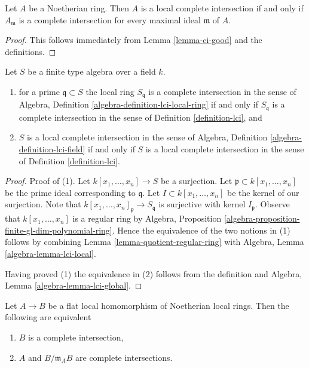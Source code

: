 \begin{lemma}
\label{lemma-check-lci-at-maximal-ideals}
Let $A$ be a Noetherian ring. Then $A$ is a local complete intersection
if and only if $A_\mathfrak m$ is a complete intersection for every
maximal ideal $\mathfrak m$ of $A$.
\end{lemma}

\begin{proof}
This follows immediately from Lemma \ref{lemma-ci-good} and the definitions.
\end{proof}

\begin{lemma}
\label{lemma-check-lci-agrees}
Let $S$ be a finite type algebra over a field $k$.
\begin{enumerate}
\item for a prime $\mathfrak q \subset S$ the local ring $S_\mathfrak q$
is a complete intersection in the sense of
Algebra, Definition \ref{algebra-definition-lci-local-ring}
if and only if $S_\mathfrak q$ is a complete
intersection in the sense of Definition \ref{definition-lci}, and
\item $S$ is a local complete intersection in the sense of
Algebra, Definition \ref{algebra-definition-lci-field}
if and only if $S$ is a local complete
intersection in the sense of Definition \ref{definition-lci}.
\end{enumerate}
\end{lemma}

\begin{proof}
Proof of (1). Let $k[x_1, \ldots, x_n] \to S$ be a surjection.
Let $\mathfrak p \subset k[x_1, \ldots, x_n]$ be the prime ideal
corresponding to $\mathfrak q$.
Let $I \subset k[x_1, \ldots, x_n]$ be the kernel of our surjection.
Note that $k[x_1, \ldots, x_n]_\mathfrak p \to S_\mathfrak q$
is surjective with kernel $I_\mathfrak p$. Observe that
$k[x_1, \ldots, x_n]$ is a regular ring by
Algebra, Proposition \ref{algebra-proposition-finite-gl-dim-polynomial-ring}.
Hence the equivalence of the two notions in (1) follows by
combining
Lemma \ref{lemma-quotient-regular-ring}
with Algebra, Lemma \ref{algebra-lemma-lci-local}.

\medskip\noindent
Having proved (1) the equivalence in (2) follows from the
definition and Algebra, Lemma \ref{algebra-lemma-lci-global}.
\end{proof}

\begin{lemma}
\label{lemma-avramov}
Let $A \to B$ be a flat local homomorphism of Noetherian local rings.
Then the following are equivalent
\begin{enumerate}
\item $B$ is a complete intersection,
\item $A$ and $B/\mathfrak m_A B$ are complete intersections.
\end{enumerate}
\end{lemma}

